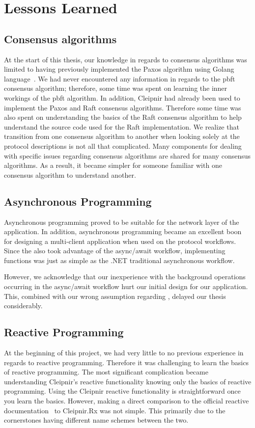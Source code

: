 \section{Lessons Learned}
\subsection{Consensus algorithms}
At the start of this thesis, our knowledge in regards to consensus algorithms was limited to having previously implemented the Paxos algorithm using Golang language~\cite{WEB:golangmainpage}. We had never encountered any information in regards to the \ac{pbft} consensus algorithm; therefore, some time was spent on learning the inner workings of the \ac{pbft} algorithm. In addition, Cleipnir had already been used to implement the Paxos and Raft consensus algorithms. Therefore some time was also spent on understanding the basics of the Raft consensus algorithm to help understand the source code used for the Raft implementation. We realize that transition from one consensus algorithm to another when looking solely at the protocol descriptions is not all that complicated. Many components for dealing with specific issues regarding consensus algorithms are shared for many consensus algorithms. As a result, it became simpler for someone familiar with one consensus algorithm to understand another.

\subsection{Asynchronous Programming}
Asynchronous programming proved to be suitable for the network layer of the application. In addition, asynchronous programming became an excellent boon for designing a multi-client application when used on the protocol workflows. Since the  also took advantage of the async/await workflow, implementing  functions was just as simple as the .NET traditional asynchronous workflow.

However, we acknowledge that our inexperience with the background operations occurring in the async/await workflow hurt our initial design for our application. This, combined with our wrong assumption regarding , delayed our thesis considerably. 
\subsection{Reactive Programming}
At the beginning of this project, we had very little to no previous experience in regards to reactive programming. Therefore it was challenging to learn the basics of reactive programming. The most significant complication became understanding Cleipnir’s reactive functionality knowing only the basics of reactive programming. Using the Cleipnir reactive functionality is straightforward once you learn the basics. However, making a direct comparison to the official reactive documentation~\cite{WEB:ReactiveXMainPage} to Cleipnir.Rx was not simple. This primarily due to the cornerstones having different name schemes between the two.


